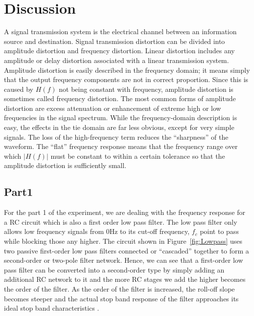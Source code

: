 \documentclass[a4paper, 12pt, english]{article}
\begin{document}
\section{Discussion}
A signal transmission system is the electrical channel between an information source and destination. Signal transmission distortion can be divided into amplitude distortion and frequency distortion. Linear distortion includes any amplitude or delay distortion associated with a linear transmission system. Amplitude distortion is easily described in the frequency domain; it means simply that the output frequency components are not in correct proportion. Since this is caused by $H(f)$ not being constant with frequency, amplitude distortion is sometimes called frequency distortion. The most common forms of amplitude distortion are excess attenuation or enhancement of extreme high or low frequencies in the signal spectrum. While the frequency-domain description is easy, the effects in the tie domain are far less obvious, except for very simple signals. The loss of the high-frequency term reduces the “sharpness” of the waveform. The “flat” frequency response means that the frequency range over which $|H(f)|$ must be constant to within a certain tolerance so that the amplitude distortion is sufficiently small. 

\subsection{Part1}
For the part 1 of the experiment, we are dealing with the frequency response for a RC circuit which is also a first order low pass filter. The low pass filter only allows low frequency signals from 0Hz to its cut-off frequency, $f_{c}$ point to pass while blocking those any higher. The circuit shown in Figure~\ref{fig:Lowpass} uses two passive first-order low pass filters connected or “cascaded” together to form a second-order or two-pole filter network. Hence, we can see that a first-order low pass filter can be converted into a second-order type by simply adding an additional RC network to it and the more RC stages we add the higher becomes the order of the filter. As the order of the filter is increased, the roll-off slope becomes steeper and the actual stop band response of the filter approaches its ideal stop band characteristics \cite{LPF}.
\newline
\end{document}
